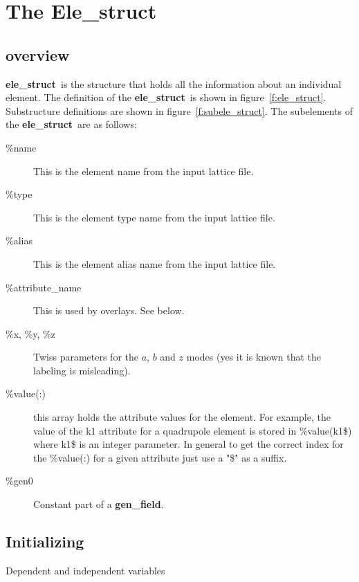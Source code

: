 \documentclass{book}
\newcommand{\elestruct}{{\bf ele\_struct}}
\newcommand{\genfield}{{\bf gen\_field}}
\newcommand{\bmad}{{\bf BMAD}}
\begin{document}




\chapter{The Ele\_struct}

\section{overview}

\elestruct\ is the structure that holds all the information about an
individual element. The definition of the \elestruct\ is shown in 
figure~\ref{f:ele_struct}. Substructure definitions are shown in 
figure~\ref{f:subele_struct}. The subelements of the \elestruct\ are as
follows:
\begin{description}
\item[\%name] This is the element name from the input lattice file.
\item[\%type] This is the element type name from the input lattice file.
\item[\%alias] This is the element alias name from the input lattice file.
\item[\%attribute\_name] This is used by overlays. See below.
\item[\%x, \%y, \%z] Twiss parameters for the $a$, $b$ and $z$ modes (yes it is 
known that the labeling is misleading).
\item[\%value(:)] this array holds the attribute values for the element. 
For example, the value of the  k1 attribute for a quadrupole element is stored
in \%value(k1\$) where k1\$ is an integer parameter. In general to get the correct
index for the \%value(:) for a given attribute just use a "\$" as a suffix.
\item[\%gen0] Constant part of a \genfield.
\end{description} 


\section{Initializing}

  Dependent and independent variables
\end{document}
